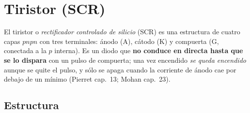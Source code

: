 \section{Tiristor (SCR)}
\label{sec:tiristor}

El tiristor o \emph{rectificador controlado de silicio} (SCR) es una estructura de cuatro capas
$pnpn$ con tres terminales: ánodo (A), cátodo (K) y compuerta (G, conectada a la $p$ interna). Es un
diodo que \textbf{no conduce en directa hasta que se lo dispara} con un pulso de compuerta; una vez
encendido \emph{se queda encendido} aunque se quite el pulso, y sólo se apaga cuando la corriente de
ánodo cae por debajo de un mínimo (Pierret cap.~13; Mohan cap.~23).

\subsection{Estructura}

